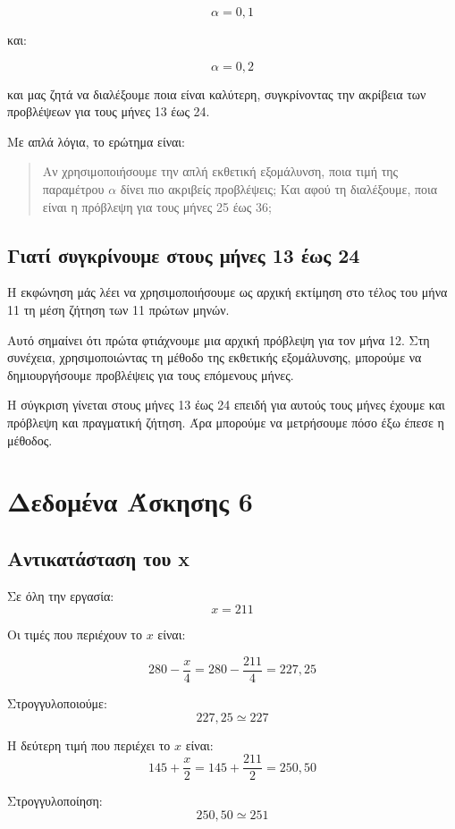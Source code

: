 \documentclass[12pt,a4paper]{article}
\begin{document}
\[
\alpha=0{,}1
\]

και:

\[
\alpha=0{,}2
\]

και μας ζητά να διαλέξουμε ποια είναι καλύτερη, συγκρίνοντας την ακρίβεια των προβλέψεων για τους μήνες 13 έως 24.

Με απλά λόγια, το ερώτημα είναι:

\begin{quote}
Αν χρησιμοποιήσουμε την απλή εκθετική εξομάλυνση, ποια τιμή της παραμέτρου \(\alpha\) δίνει πιο ακριβείς προβλέψεις; Και αφού τη διαλέξουμε, ποια είναι η πρόβλεψη για τους μήνες 25 έως 36;
\end{quote}

\subsection{Γιατί συγκρίνουμε στους μήνες 13 έως 24}

Η εκφώνηση μάς λέει να χρησιμοποιήσουμε ως αρχική εκτίμηση στο τέλος του μήνα 11 τη μέση ζήτηση των 11 πρώτων μηνών.

Αυτό σημαίνει ότι πρώτα φτιάχνουμε μια αρχική πρόβλεψη για τον μήνα 12. Στη συνέχεια, χρησιμοποιώντας τη μέθοδο της εκθετικής εξομάλυνσης, μπορούμε να δημιουργήσουμε προβλέψεις για τους επόμενους μήνες.

Η σύγκριση γίνεται στους μήνες 13 έως 24 επειδή για αυτούς τους μήνες έχουμε και πρόβλεψη και πραγματική ζήτηση. Άρα μπορούμε να μετρήσουμε πόσο έξω έπεσε η μέθοδος.

\section{Δεδομένα Άσκησης 6}

\subsection{Αντικατάσταση του x}

Σε όλη την εργασία:
\[
x=211
\]

Οι τιμές που περιέχουν το \(x\) είναι:

\[
280-\frac{x}{4}=280-\frac{211}{4}=227{,}25
\]

Στρογγυλοποιούμε:
\[
227{,}25 \simeq 227
\]

Η δεύτερη τιμή που περιέχει το \(x\) είναι:
\[
145+\frac{x}{2}=145+\frac{211}{2}=250{,}50
\]

Στρογγυλοποίηση:
\[
250{,}50 \simeq 251
\]
\end{document}
